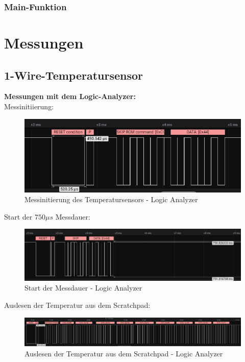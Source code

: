 \documentclass[12pt,a4paper]{article}
\begin{document}
\pagebreak

\subsubsection{Main-Funktion}
\begin{minipage}{\textwidth}
	
\end{minipage}

\pagebreak

\section{Messungen}
\subsection{1-Wire-Temperatursensor}
\textbf{Messungen mit dem Logic-Analyzer:} \\
Messinitiierung:
\begin{figure}[H]
	\centering
	\includegraphics[width=0.9\linewidth]{Messinitialisierung_1wire_Logic}
	\caption{Messinitierung des Temperatursensors - Logic Analyzer}
	\label{figure:Messinitialisierung_1wire_Logic}
\end{figure}

Start der $750\mu s$ Messdauer:
\begin{figure}[H]
	\centering
	\includegraphics[width=1\linewidth]{Messdauer_750ms_1wire_Logic}
	\caption{Start der Messdauer - Logic Analyzer}
	\label{figure:Messdauer_750ms_1wire_Logic}
\end{figure}

Auslesen der Temperatur aus dem Scratchpad:
\begin{figure}[H]
	\centering
	\includegraphics[width=1\linewidth]{scratchpad_1wire_Logic}
	\caption{Auslesen der Temperatur aus dem Scratchpad - Logic Analyzer}
	\label{figure:scratchpad_1wire_Logic}
\end{figure}
\end{document}
